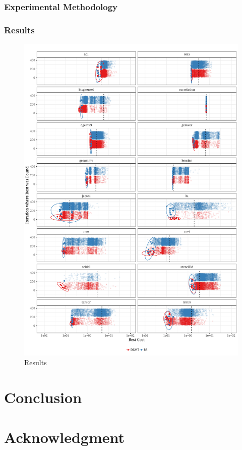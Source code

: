 \documentclass[conference]{IEEEtran}
\begin{document}
\subsubsection{Experimental Methodology}
\label{sec:orgbe51a17}
\subsubsection{Results}
\label{sec:orgd5a162e}
\begin{center}
\begin{figure}[p]
\centering
\includegraphics[width=.9\textwidth]{./img/iteration_best_comparison.pdf}
\caption{Results}
\end{figure}
\end{center}
\clearpage
\section{Conclusion}
\label{sec:orgfe28a60}
\section*{Acknowledgment}
\label{sec:org15d32eb}


\end{document}
